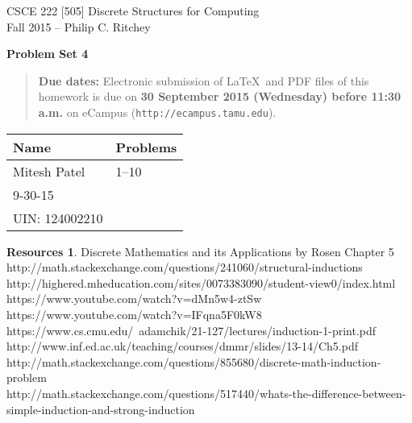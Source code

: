 \documentclass{article}
\theoremstyle{definition}
\newtheorem*{resources}{Resources}
\newcommand{\names}[5]{
\begin{tabular}{|ll|}
\hline
\textbf{Name}  & \textbf{Problems}\\
\hline
#1 & 1--10\\
#2 & #3\\
#4 & #5\\
\hline
\end{tabular}}
\newcommand{\problemset}[1]{\begin{center}\textbf{Problem Set #1}\end{center}}
\newcommand{\duedate}[1]{\begin{quote}\textbf{Due dates:} Electronic
    submission of \LaTeX\ and PDF files of this homework is due on
    \textbf{#1} on eCampus (\texttt{http://ecampus.tamu.edu}). 
    \end{quote}}
\begin{document}
\begin{center}
{\large
CSCE 222 [505] Discrete Structures for Computing\\[.5ex]
Fall 2015 -- Philip C. Ritchey\\}
\end{center}

\problemset{4}

\duedate{30 September 2015 (Wednesday) before 11:30 a.m.}

\names{Mitesh Patel}
{9-30-15}{}
{UIN: 124002210}{}

\begin{resources}Discrete Mathematics and its Applications by Rosen Chapter 5
 \\
http://math.stackexchange.com/questions/241060/structural-inductions
\\
http://highered.mheducation.com/sites/0073383090/student-view0/index.html
\\
https://www.youtube.com/watch?v=dMn5w4-ztSw
\\
https://www.youtube.com/watch?v=IFqna5F0kW8
\\
https://www.cs.cmu.edu/~adamchik/21-127/lectures/induction-1-print.pdf
\\
http://www.inf.ed.ac.uk/teaching/courses/dmmr/slides/13-14/Ch5.pdf
\\
http://math.stackexchange.com/questions/855680/discrete-math-induction-problem
\\
http://math.stackexchange.com/questions/517440/whats-the-difference-between-simple-induction-and-strong-induction
\end{resources}

\bigskip
\end{document}
